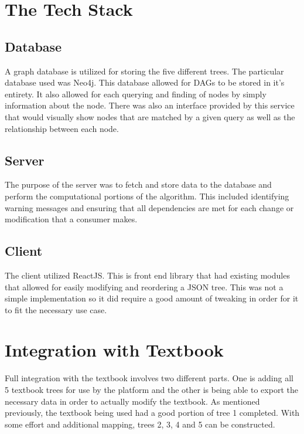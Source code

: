 \section{The Tech Stack}

\subsection{Database}

A graph database is utilized for storing the five different trees. The particular database used was Neo4j. This database allowed for DAGs to be stored in it's entirety. It also allowed for each querying and finding of nodes by simply information about the node. There was also an interface provided by this service that would visually show nodes that are matched by a given query as well as the relationship between each node. 

\subsection{Server}

The purpose of the server was to fetch and store data to the database and perform the computational portions of the algorithm. This included identifying warning messages and ensuring that all dependencies are met for each change or modification that a consumer makes. 

\subsection{Client}

The client utilized ReactJS. This is front end library that had existing modules that allowed for easily modifying and reordering a JSON tree. This was not a simple implementation so it did require a good amount of tweaking in order for it to fit the necessary use case.

\section{Integration with Textbook}

Full integration with the textbook involves two different parts. One is adding all 5 textbook trees for use by the platform and the other is being able to export the necessary data in order to actually modify the textbook. As mentioned previously, the textbook being used had a good portion of tree 1 completed. With some effort and additional mapping, trees 2, 3, 4 and 5 can be constructed.

